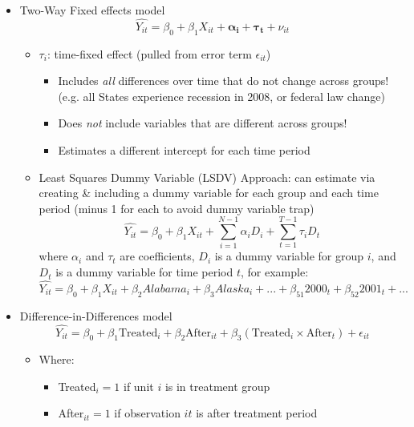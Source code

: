 \documentclass{article}
\begin{document}
\begin{itemize}
\begin{itemize}
	\end{itemize}
	\item Two-Way Fixed effects model 
	\begin{equation*}
	\widehat{Y_{it}}=\beta_0+\beta_1X_{it}+\mathbf{\alpha_i}+\mathbf{\tau_t}+\nu_{it}
	\end{equation*}
	\begin{itemize}
		\item  $\tau_i$: time-fixed effect (pulled from error term $\epsilon_{it}$)  
		\begin{itemize}
			\item Includes \emph{all} differences over time that do not change across groups! (e.g. all States experience recession in 2008, or federal law change)
			\item Does \emph{not} include variables that are different across groups! 
			\item Estimates a different intercept for each time period
		\end{itemize}
		\item Least Squares Dummy Variable (LSDV) Approach: can estimate via creating \& including a dummy variable for each group and each time period (minus 1 for each to avoid dummy variable trap)
		\begin{equation*}
			\widehat{Y_{it}}=\beta_0+\beta_1X_{it}+\sum_{i=1}^{N-1} \alpha_i D_{i}+\sum_{t=1}^{T-1} \tau_i D_{t}
		\end{equation*}
		where $\alpha_i$ and $\tau_t$ are coefficients, $D_i$ is a dummy variable for group $i$, and $D_t$ is a dummy variable for time period $t$, for example: 
			\begin{equation*}
				\widehat{Y_{it}}=\beta_0+\beta_1X_{it}+\beta_2 Alabama_i+\beta_3 Alaska_i+... +\beta_{51}2000_t + \beta_{52}2001_t + ...
			\end{equation*}
	\end{itemize}
\clearpage 
	\item Difference-in-Differences model
	\begin{equation*}
	\widehat{Y_{it}}=\beta_0+\beta_1 \text{Treated}_i +\beta_2 \text{After}_{it}+\beta_3 (\text{Treated}_i \times \text{After}_{t})+\epsilon_{it}
	\end{equation*}
		\begin{itemize}
		\item Where: 
			\begin{itemize}
				\item Treated$_i=1$ if unit $i$ is in treatment group
				\item After$_{it}=1$ if observation $it$ is after treatment period 

\end{itemize}
\end{itemize}
\end{itemize}
\end{document}
